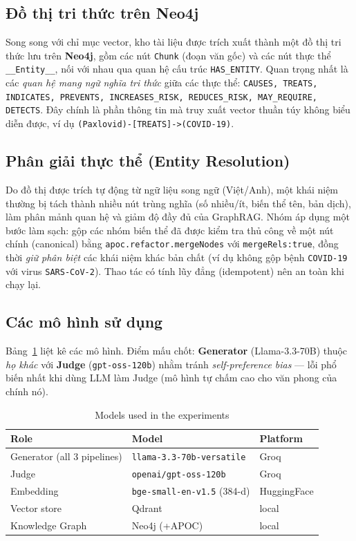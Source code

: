 \documentclass[conference]{IEEEtran}
\begin{document}
\subsection{Đồ thị tri thức trên Neo4j}
Song song với chỉ mục vector, kho tài liệu được trích xuất thành một đồ thị tri thức lưu trên \textbf{Neo4j}, gồm các nút \texttt{Chunk} (đoạn văn gốc) và các nút thực thể \texttt{\_\_Entity\_\_}, nối với nhau qua quan hệ cấu trúc \texttt{HAS\_ENTITY}. Quan trọng nhất là các \emph{quan hệ mang ngữ nghĩa tri thức} giữa các thực thể: \texttt{CAUSES, TREATS, INDICATES, PREVENTS, INCREASES\_RISK, REDUCES\_RISK, MAY\_REQUIRE, DETECTS}. Đây chính là phần thông tin mà truy xuất vector thuần túy không biểu diễn được, ví dụ \texttt{(Paxlovid)-[TREATS]->(COVID-19)}.

\subsection{Phân giải thực thể (Entity Resolution)}
Do đồ thị được trích tự động từ ngữ liệu song ngữ (Việt/Anh), một khái niệm thường bị tách thành nhiều nút trùng nghĩa (số nhiều/ít, biến thể tên, bản dịch), làm phân mảnh quan hệ và giảm độ đầy đủ của GraphRAG. Nhóm áp dụng một bước làm sạch: gộp các nhóm biến thể đã được kiểm tra thủ công về một nút chính (canonical) bằng \texttt{apoc.refactor.mergeNodes} với \texttt{mergeRels:true}, đồng thời \emph{giữ phân biệt} các khái niệm khác bản chất (ví dụ không gộp bệnh \texttt{COVID-19} với virus \texttt{SARS-CoV-2}). Thao tác có tính lũy đẳng (idempotent) nên an toàn khi chạy lại.

\subsection{Các mô hình sử dụng}
Bảng~\ref{tab:models} liệt kê các mô hình. Điểm mấu chốt: \textbf{Generator} (Llama-3.3-70B) thuộc \emph{họ khác} với \textbf{Judge} (\texttt{gpt-oss-120b}) nhằm tránh \emph{self-preference bias} --- lỗi phổ biến nhất khi dùng LLM làm Judge (mô hình tự chấm cao cho văn phong của chính nó).

\begin{table}[!t]
\caption{Models used in the experiments}
\label{tab:models}
\centering
\footnotesize
\begin{tabular}{@{}p{} p{} p{}@{}}
\toprule
\textbf{Role} & \textbf{Model} & \textbf{Platform} \\
\midrule
Generator (all 3 pipelines) & \texttt{llama-3.3-70b-versatile} & Groq \\
Judge & \texttt{openai/gpt-oss-120b} & Groq \\
Embedding & \texttt{bge-small-en-v1.5} (384-d) & HuggingFace \\
Vector store & Qdrant & local \\
Knowledge Graph & Neo4j (+APOC) & local \\
\bottomrule
\end{tabular}
\end{table}
\end{document}
